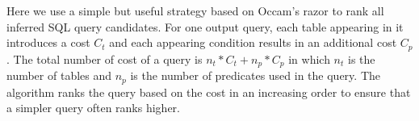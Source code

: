Here we use a simple but useful strategy based on Occam's razor to rank all inferred SQL query candidates.
For one output query, each table appearing in it introduces a cost $C_t$ and each appearing condition 
results in an additional cost $C_p$. The total number of cost of a query is $n_t*C_t+n_p*C_p$ in which
$n_t$ is the number of tables and $n_p$ is the number of predicates used in the query. The algorithm
ranks the query based on the cost in an increasing order to ensure that a simpler query often ranks higher.



